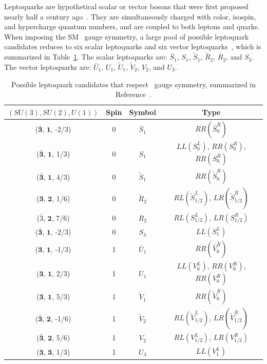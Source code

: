 Leptoquarks are hypothetical scalar or vector bosons that were first proposed nearly half a century ago~\cite{Pati:1973uk}. They are simultaneously charged with color, isospin, and hypercharge quantum numbers, and are coupled to both leptons and quarks. When imposing the \ac{SM} \sm~gauge symmetry, a large pool of possible leptoquark candidates reduces to six scalar leptoquarks and six vector leptoquarks~\cite{Dorsner:2016wpm}, which is summarized in Table~\ref{tab:Leptoquark}. The scalar leptoquarks are: $\bar{S}_{1}$, $S_{1}$, $\tilde{S}_{1}$, $\tilde{R}_{2}$, $R_{2}$, and $S_{3}$. The vector leptoquarks are: $\bar{U}_{1}$, $U_{1}$, $\tilde{U}_{1}$, $\tilde{V}_{2}$, $V_{2}$, and $U_{3}$. 

\begin{table}[th]
\sffamily
\centering
\caption{Possible leptoquark candidates that respect \sm~gauge symmetry, summarized in Reference~\cite{Dorsner:2016wpm}.}
\begin{tabular}{cccc}
\toprule 
$(SU(3), SU(2), U(1))$ & Spin   & Symbol & Type \\ \midrule
($\bar{\bm{3}}$, $\bm{1}$, -2/3) & 0 & $\bar{S}_{1}$ & $\overline{RR}(\bar{S}_{0}^{\bar{R}})$ \\
($\bar{\bm{3}}$, $\bm{1}$, 1/3) & 0 & $S_{1}$ & $LL(S_{0}^{L})$, $RR(S_{0}^{R})$, $\overline{RR}(S_{0}^{\bar{R}})$ \\
($\bar{\bm{3}}$, $\bm{1}$, 4/3) & 0 & $\tilde{S}_{1}$ & $RR(\tilde{S}_{0}^{R})$ \\
($\bm{3}$, $\bm{2}$, 1/6) & 0 & $\tilde{R}_{2}$ & $RL(\tilde{S}_{1/2}^{L})$, $\overline{LR}(\tilde{S}_{1/2}^{\bar{R}})$ \\
($\bar{3}$, $\bm{2}$, 7/6) & 0 & $R_{2}$ & $RL(S_{1/2}^{L})$, $LR(S_{1/2}^{R})$ \\
($\bar{\bm{3}}$, $\bm{1}$, -2/3) & 0 & $S_{3}$ & $LL(S_{1}^{L})$\\
\midrule
($\bm{3}$, $\bm{1}$, -1/3) & 1 & $\bar{U}_{1}$ & $\overline{RR}(\bar{V}_{0}^{\bar{R}})$ \\
($\bm{3}$, $\bm{1}$, 2/3) & 1 & $U_{1}$ & $LL(V_{0}^{L})$, $RR(V_{0}^{R})$, $\overline{RR}(V_{0}^{\bar{R}})$ \\
($\bm{3}$, $\bm{1}$, 5/3) & 1 & $\tilde{V}_{1}$ & $RR(\tilde{V}_{0}^{R})$ \\
($\bar{\bm{3}}$, $\bm{2}$, -1/6) & 1 & $\tilde{V}_{2}$ & $RL(\tilde{V}_{1/2}^{L})$, $\overline{LR}(\tilde{V}_{1/2}^{\bar{R}})$ \\
($\bar{\bm{3}}$, $\bm{2}$, 5/6) & 1 & $V_{2}$ & $RL(V_{1/2}^{L})$, $LR(V_{1/2}^{R})$ \\
($\bm{3}$, $\bm{3}$, 1/3) & 1 & $U_{3}$ & $LL(V_{1}^{L})$\\
\bottomrule
\end{tabular}
\vspace{-0.5em}
\label{tab:Leptoquark}
\end{table}

